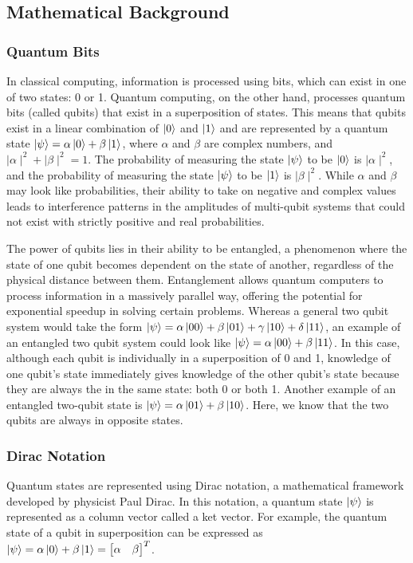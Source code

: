\subsection{Mathematical Background}

\subsubsection{Quantum Bits}
In classical computing, information is processed using bits, which can exist in one of two states: 0 or 1. Quantum computing, on the other hand, processes quantum bits (called qubits) that exist in a superposition of states. This means that qubits exist in a linear combination of $\ket{0}$ and $\ket{1}$ and are represented by a quantum state $\ket{\psi} = \alpha\ket{0} + \beta\ket{1}$, where $\alpha$ and $\beta$ are complex numbers, and $\mid\alpha\mid^2 + \mid\beta\mid^2 = 1$.  The probability of measuring the state $\ket{\psi}$ to be $\ket{0}$ is $\mid\alpha\mid^2$, and the probability of measuring the state $\ket{\psi}$ to be $\ket{1}$ is $\mid\beta\mid^2$.  While $\alpha$ and $\beta$ may look like probabilities, their ability to take on negative and complex values leads to interference patterns in the amplitudes of multi-qubit systems that could not exist with strictly positive and real probabilities.

The power of qubits lies in their ability to be entangled, a phenomenon where the state of one qubit becomes dependent on the state of another, regardless of the physical distance between them. Entanglement allows quantum computers to process information in a massively parallel way, offering the potential for exponential speedup in solving certain problems.  Whereas a general two qubit system would take the form $\ket{\psi} = \alpha\ket{00} + \beta\ket{01} + \gamma\ket{10} + \delta\ket{11}$, an example of an entangled two qubit system could look like $\ket{\psi} = \alpha\ket{00} + \beta\ket{11}$.  In this case, although each qubit is individually in a superposition of 0 and 1, knowledge of one qubit's state immediately gives knowledge of the other qubit's state because they are always the in the same state: both 0 or both 1.  Another example of an entangled two-qubit state is $\ket{\psi} = \alpha\ket{01} + \beta\ket{10}$.  Here, we know that the two qubits are always in opposite states.

\subsubsection{Dirac Notation}
Quantum states are represented using Dirac notation, a mathematical framework developed by physicist Paul Dirac. In this notation, a quantum state $\ket{\psi}$ is represented as a column vector called a ket vector. For example, the quantum state of a qubit in superposition can be expressed as $\ket{\psi} = \alpha\ket{0} + \beta\ket{1} = \begin{bmatrix} \alpha & \beta \end{bmatrix}^T$.

